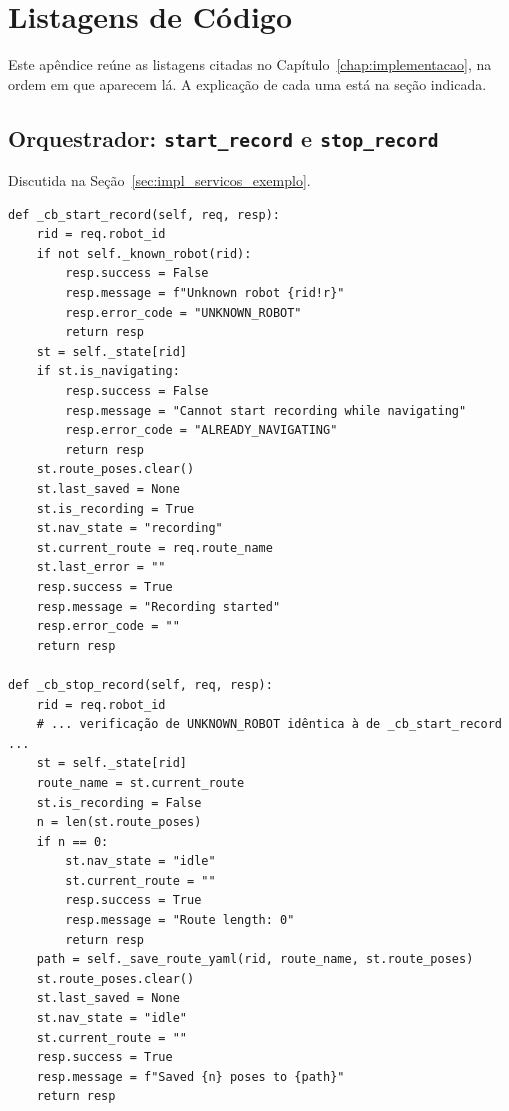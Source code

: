 \chapter{Listagens de Código}
\label{ap:listagens}

Este apêndice reúne as listagens citadas no Capítulo~\ref{chap:implementacao},
na ordem em que aparecem lá. A explicação de cada uma está na seção indicada.

\section{Orquestrador: \texttt{start\_\allowbreak record} e \texttt{stop\_\allowbreak record}}

Discutida na Seção~\ref{sec:impl_servicos_exemplo}.

\begin{lstlisting}[style=pycode, caption={Callbacks \texttt{\_\allowbreak cb\_\allowbreak start\_\allowbreak record} e \texttt{\_\allowbreak cb\_\allowbreak stop\_\allowbreak record}, com boilerplate repetido elidido (\texttt{fleet\_\allowbreak orchestrator/\allowbreak main.py}).}, label={lst:start_stop_record}]
def _cb_start_record(self, req, resp):
    rid = req.robot_id
    if not self._known_robot(rid):
        resp.success = False
        resp.message = f"Unknown robot {rid!r}"
        resp.error_code = "UNKNOWN_ROBOT"
        return resp
    st = self._state[rid]
    if st.is_navigating:
        resp.success = False
        resp.message = "Cannot start recording while navigating"
        resp.error_code = "ALREADY_NAVIGATING"
        return resp
    st.route_poses.clear()
    st.last_saved = None
    st.is_recording = True
    st.nav_state = "recording"
    st.current_route = req.route_name
    st.last_error = ""
    resp.success = True
    resp.message = "Recording started"
    resp.error_code = ""
    return resp

def _cb_stop_record(self, req, resp):
    rid = req.robot_id
    # ... verificação de UNKNOWN_ROBOT idêntica à de _cb_start_record ...
    st = self._state[rid]
    route_name = st.current_route
    st.is_recording = False
    n = len(st.route_poses)
    if n == 0:
        st.nav_state = "idle"
        st.current_route = ""
        resp.success = True
        resp.message = "Route length: 0"
        return resp
    path = self._save_route_yaml(rid, route_name, st.route_poses)
    st.route_poses.clear()
    st.last_saved = None
    st.nav_state = "idle"
    st.current_route = ""
    resp.success = True
    resp.message = f"Saved {n} poses to {path}"
    return resp
\end{lstlisting}

